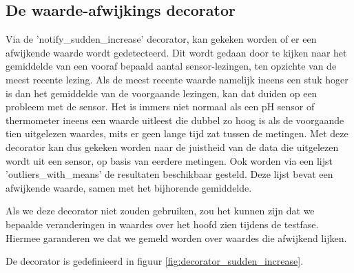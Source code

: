 \documentclass[a4paper]{report}
\begin{document}
\subsection{De waarde-afwijkings decorator}
Via de 'notify\_sudden\_increase' decorator, kan gekeken worden of er een afwijkende waarde wordt gedetecteerd. 
Dit wordt gedaan door te kijken naar het gemiddelde van een vooraf bepaald aantal sensor-lezingen, ten opzichte van de meest recente lezing. 
Als de meest recente waarde namelijk ineens een stuk hoger is dan het gemiddelde van de voorgaande lezingen, kan dat duiden op een probleem met de sensor.
Het is immers niet normaal als een pH sensor of thermometer ineens een waarde uitleest die dubbel zo hoog is als de voorgaande tien uitgelezen waardes, mits er geen lange tijd zat tussen de metingen.
Met deze decorator kan dus gekeken worden naar de juistheid van de data die uitgelezen wordt uit een sensor, op basis van eerdere metingen.
Ook worden via een lijst 'outliers\_with\_means' de resultaten beschikbaar gesteld.
Deze lijst bevat een afwijkende waarde, samen met het bijhorende gemiddelde.
\par\smallskip 
Als we deze decorator niet zouden gebruiken, zou het kunnen zijn dat we bepaalde veranderingen in waardes over het hoofd zien tijdens de testfase.
Hiermee garanderen we dat we gemeld worden over waardes die afwijkend lijken.
\par\smallskip
De decorator is gedefinieerd in figuur \ref{fig:decorator_sudden_increase}.
\end{document}
